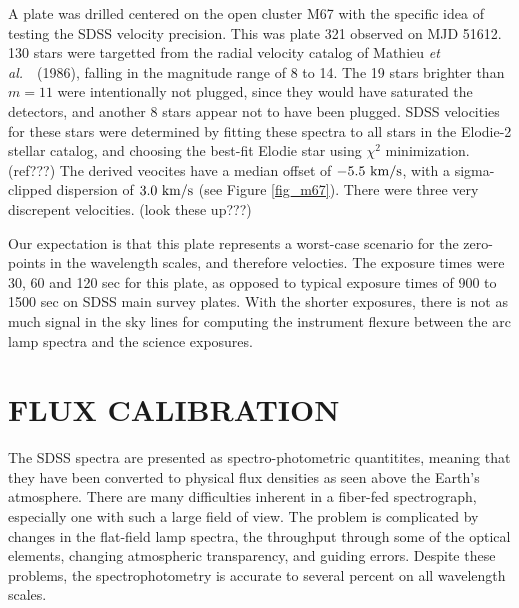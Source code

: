 \documentclass[12pt,preprint]{aastex}
\newcommand{\etal}{{\it et al.}~}
\newcommand{\kms}{{\rm ~km/s}}
\begin{document}

A plate was drilled centered on the open cluster M67 with the
specific idea of testing the SDSS velocity precision.
This was plate 321 observed on MJD 51612.  
130 stars were targetted from the radial velocity catalog
of Mathieu \etal\ (1986), falling in the magnitude range of 8 to 14.
The 19 stars brighter than $m=11$ were intentionally not plugged, since they
would have saturated the detectors, and another 8 stars appear not
to have been plugged.  SDSS velocities for these stars were determined
by fitting these spectra to all stars in the Elodie-2 stellar catalog,
and choosing the best-fit Elodie star using $\chi^2$ minimization.  (ref???)
The derived veocites have a median offset of $-5.5\kms$, with a sigma-clipped
dispersion of $3.0 \kms$ (see Figure \ref{fig_m67}).
There were three very discrepent velocities. (look these up???)

Our expectation is that this plate represents a worst-case scenario
for the zero-points in the wavelength scales, and therefore velocties.
The exposure times were 30, 60 and 120 sec for this plate, as opposed
to typical exposure times of 900 to 1500 sec on SDSS main survey plates.
With the shorter exposures, there is not as much signal in the sky lines
for computing the instrument flexure between the arc lamp spectra and
the science exposures.

\section{FLUX CALIBRATION}
\label{sec_fluxing}

The SDSS spectra are presented as spectro-photometric quantitites,
meaning that they have been converted to physical flux densities
as seen above the Earth's atmosphere.
There are many difficulties inherent in a fiber-fed spectrograph,
especially one with such a large field of view.
The problem is complicated by changes in the flat-field lamp spectra,
the throughput through some of the optical elements, changing
atmospheric transparency, and guiding errors.
Despite these problems, the spectrophotometry is accurate to
several percent on all wavelength scales.
\end{document}
